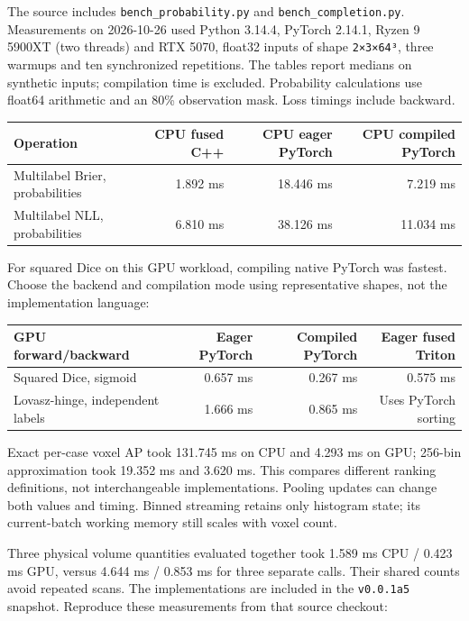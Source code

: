 The source includes \texttt{bench\_probability.py} and \texttt{bench\_completion.py}. Measurements
on 2026-10-26 used Python 3.14.4, PyTorch 2.14.1, Ryzen 9 5900XT (two threads) and RTX 5070,
float32 inputs of shape \texttt{2×3×64³}, three warmups and ten synchronized repetitions.
The tables report medians on synthetic inputs; compilation time is excluded. Probability
calculations use float64 arithmetic and an 80\% observation mask. Loss timings include backward.

{\small{} %
\begin{longtable}[]{@{}lrrr@{}}
\toprule\noalign{}
Operation & CPU fused C++ & CPU eager PyTorch & CPU compiled PyTorch \\
\midrule\noalign{}
\endhead
\bottomrule\noalign{}
\endlastfoot
Multilabel Brier, probabilities & 1.892 ms & 18.446 ms & 7.219 ms \\
Multilabel NLL, probabilities & 6.810 ms & 38.126 ms & 11.034 ms \\
\end{longtable}
}

For squared Dice on this GPU workload, compiling native PyTorch was fastest. Choose the
backend and compilation mode using representative shapes, not the implementation language:

{\small{} %
\begin{longtable}[]{@{}lrrr@{}}
\toprule\noalign{}
GPU forward/backward & Eager PyTorch & Compiled PyTorch & Eager fused Triton \\
\midrule\noalign{}
\endhead
\bottomrule\noalign{}
\endlastfoot
Squared Dice, sigmoid & 0.657 ms & 0.267 ms & 0.575 ms \\
Lovasz-hinge, independent labels & 1.666 ms & 0.865 ms & Uses PyTorch sorting \\
\end{longtable}
}

Exact per-case voxel AP took 131.745 ms on CPU and 4.293 ms on GPU; 256-bin approximation
took 19.352 ms and 3.620 ms. This compares different ranking definitions, not interchangeable
implementations. Pooling updates can change both values and timing. Binned streaming retains
only histogram state; its current-batch working memory still scales with voxel count.

Three physical volume quantities evaluated together took 1.589 ms CPU / 0.423 ms GPU,
versus 4.644 ms / 0.853 ms for three separate calls. Their shared counts avoid repeated scans.
The implementations are included in the \texttt{v0.0.1a5} snapshot. Reproduce these measurements
from that source checkout:

